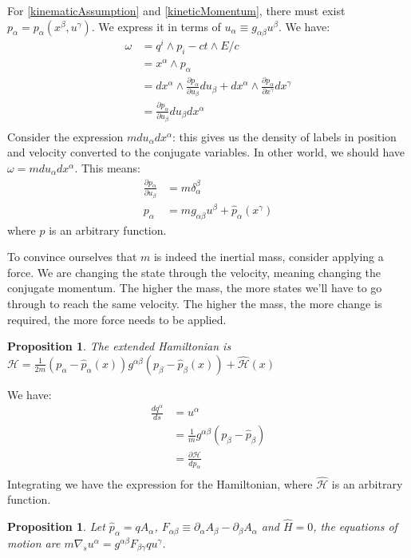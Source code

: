 \documentclass[aps,pra,10pt,twocolumn,floatfix,nofootinbib]{revtex4-1}
\newtheorem{prop}[thm]{Proposition}
\theoremstyle{definition}
\begin{document}
For \ref{kinematicAssumption} and \ref{kineticMomentum}, there must exist $p_\alpha=p_\alpha(x^\beta , u^\gamma)$. We express it in terms of $u_\alpha\equiv g_{\alpha \beta} u^\beta$. We have:
\begin{align*}
\omega &= q^i\wedge p_i - ct \wedge E/c \\
&=x^\alpha \wedge p_\alpha \\
&=dx^\alpha \wedge \frac{\partial p_\alpha}{\partial u_\beta}du_\beta + dx^\alpha \wedge \frac{\partial p_\alpha}{\partial x^\gamma}dx^\gamma \\
&=\frac{\partial p_\alpha}{\partial u_\beta}du_\beta dx^\alpha \\
\end{align*}
Consider the expression $m du_\alpha dx^\alpha$: this gives us the density of labels in position and velocity converted to the conjugate variables. In other world, we should have $\omega=m du_\alpha dx^\alpha$. This means:
\begin{align*}
\frac{\partial p_\alpha}{\partial u_\beta} &= m \delta^\beta_\alpha \\
p_\alpha &= m g_{\alpha \beta}u^\beta + \hat{p}_\alpha(x^\gamma)
\end{align*}
where $\hat{p}$ is an arbitrary function.

To convince ourselves that $m$ is indeed the inertial mass, consider applying a force. We are changing the state through the velocity, meaning changing the conjugate momentum. The higher the mass, the more states we'll have to go through to reach the same velocity. The higher the mass, the more change is required, the more force needs to be applied.

\begin{prop}\label{kineticHamiltonian}
The extended Hamiltonian is $\mathcal{H}=\frac{1}{2m}(p_\alpha-\hat{p}_\alpha(x))g^{\alpha\beta}(p_\beta-\hat{p}_\beta(x))+\hat{\mathcal{H}}(x)$
\end{prop}
We have:
\begin{align*}
\frac{dq^\alpha}{ds} &= u^\alpha \\
&= \frac{1}{m}g^{\alpha\beta}(p_\beta-\hat{p}_\beta) \\
&= \frac{\partial \mathcal{H}}{dp_\alpha} \\
\end{align*}
Integrating we have the expression for the Hamiltonian, where $\hat{\mathcal{H}}$ is an arbitrary function.

\begin{prop}\label{kineticLaw}
Let $\hat{p}_\alpha = q A_\alpha$, $F_{\alpha \beta} \equiv \partial_\alpha A_\beta - \partial_\beta A_\alpha$ and $\hat{H} = 0$, the equations of motion are $m \nabla_s u^\alpha = g^{\alpha\beta} F_{\beta \gamma} q u^\gamma$.
\end{prop}
\end{document}
